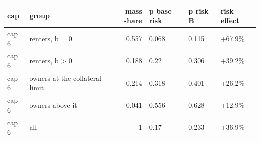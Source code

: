 \begingroup\small
\setlength{\tabcolsep}{3pt}
\renewcommand{\arraystretch}{1.04}
\begin{tabularx}{\linewidth}{XXrXXX}
\toprule
cap & group & mass share & p base risk & p risk B & risk effect \\
\midrule
cap 6 & renters, b = 0 & 0.557 & 0.068 & 0.115 & +67.9\% \\
cap 6 & renters, b \textgreater{} 0 & 0.188 & 0.22 & 0.306 & +39.2\% \\
cap 6 & owners at the collateral limit & 0.214 & 0.318 & 0.401 & +26.2\% \\
cap 6 & owners above it & 0.041 & 0.556 & 0.628 & +12.9\% \\
cap 6 & all & 1 & 0.17 & 0.233 & +36.9\% \\
\bottomrule
\end{tabularx}
\endgroup
